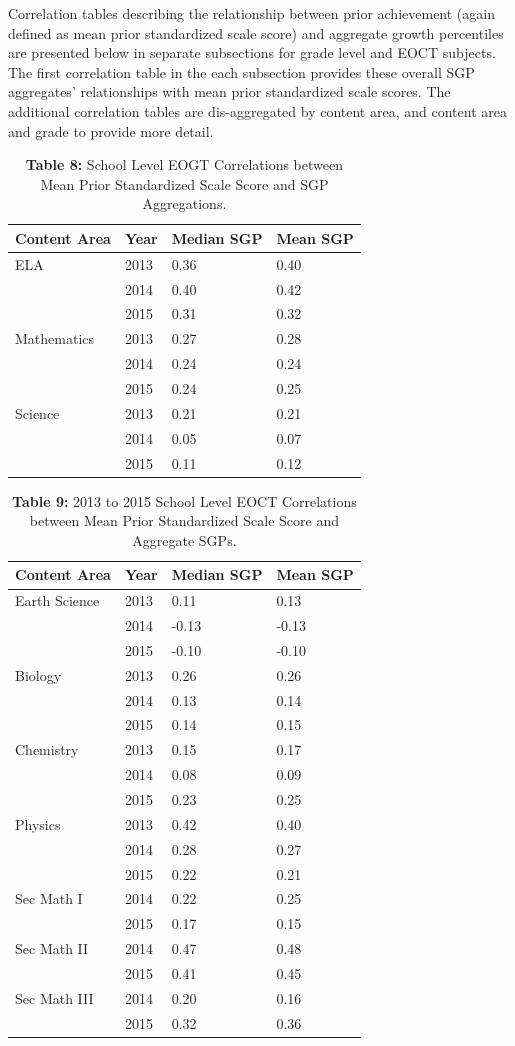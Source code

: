 \documentclass[12pt]{article}
\begin{document}
Correlation tables describing the relationship between prior achievement
(again defined as mean prior standardized scale score) and aggregate
growth percentiles are presented below in separate subsections for grade
level and EOCT subjects. The first correlation table in the each
subsection provides these overall SGP aggregates' relationships with
mean prior standardized scale scores. The additional correlation tables
are dis-aggregated by content area, and content area and grade to
provide more detail.

\begin{table}[H]
\caption*{\textbf{Table 8:} School Level EOGT Correlations between Mean Prior Standardized Scale Score and SGP Aggregations.\label{table8}} 
\begin{center}
\begin{tabular}{llll}
\hline\hline
\multicolumn{1}{c}{Content Area}&\multicolumn{1}{c}{Year}&\multicolumn{1}{c}{Median SGP}&\multicolumn{1}{c}{Mean SGP}\tabularnewline
\hline
ELA&2013&0.36&0.40\tabularnewline
&2014&0.40&0.42\tabularnewline
&2015&0.31&0.32\tabularnewline
Mathematics&2013&0.27&0.28\tabularnewline
&2014&0.24&0.24\tabularnewline
&2015&0.24&0.25\tabularnewline
Science&2013&0.21&0.21\tabularnewline
&2014&0.05&0.07\tabularnewline
&2015&0.11&0.12\tabularnewline
\hline
\end{tabular}\end{center}

\end{table}

\begin{table}[H]
\caption*{\textbf{Table 9:} 2013 to 2015 School Level EOCT Correlations between Mean Prior Standardized Scale Score and Aggregate SGPs.\label{table9}} 
\begin{center}
\begin{tabular}{llll}
\hline\hline
\multicolumn{1}{c}{Content Area}&\multicolumn{1}{c}{Year}&\multicolumn{1}{c}{Median SGP}&\multicolumn{1}{c}{Mean SGP}\tabularnewline
\hline
Earth Science&2013& 0.11& 0.13\tabularnewline
&2014&-0.13&-0.13\tabularnewline
&2015&-0.10&-0.10\tabularnewline
Biology&2013& 0.26& 0.26\tabularnewline
&2014& 0.13& 0.14\tabularnewline
&2015& 0.14& 0.15\tabularnewline
Chemistry&2013& 0.15& 0.17\tabularnewline
&2014& 0.08& 0.09\tabularnewline
&2015& 0.23& 0.25\tabularnewline
Physics&2013& 0.42& 0.40\tabularnewline
&2014& 0.28& 0.27\tabularnewline
&2015& 0.22& 0.21\tabularnewline
Sec Math I&2014& 0.22& 0.25\tabularnewline
&2015& 0.17& 0.15\tabularnewline
Sec Math II&2014& 0.47& 0.48\tabularnewline
&2015& 0.41& 0.45\tabularnewline
Sec Math III&2014& 0.20& 0.16\tabularnewline
&2015& 0.32& 0.36\tabularnewline
\hline
\end{tabular}\end{center}

\end{table}
\end{document}
